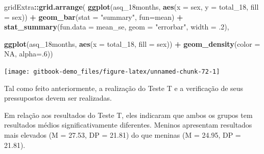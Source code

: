 \documentclass[
]{book}
\newenvironment{Shaded}{\begin{snugshade}}{\end{snugshade}}
\newcommand{\DataTypeTok}[1]{\textcolor[rgb]{0.13,0.29,0.53}{#1}}
\newcommand{\DecValTok}[1]{\textcolor[rgb]{0.00,0.00,0.81}{#1}}
\newcommand{\FloatTok}[1]{\textcolor[rgb]{0.00,0.00,0.81}{#1}}
\newcommand{\KeywordTok}[1]{\textcolor[rgb]{0.13,0.29,0.53}{\textbf{#1}}}
\newcommand{\NormalTok}[1]{#1}
\newcommand{\OperatorTok}[1]{\textcolor[rgb]{0.81,0.36,0.00}{\textbf{#1}}}
\newcommand{\OtherTok}[1]{\textcolor[rgb]{0.56,0.35,0.01}{#1}}
\newcommand{\StringTok}[1]{\textcolor[rgb]{0.31,0.60,0.02}{#1}}
\begin{document}
\begin{Shaded}
\begin{Highlighting}[]
\NormalTok{gridExtra}\OperatorTok{::}\KeywordTok{grid.arrange}\NormalTok{(}
  \KeywordTok{ggplot}\NormalTok{(asq_18months, }\KeywordTok{aes}\NormalTok{(}\DataTypeTok{x =}\NormalTok{ sex, }\DataTypeTok{y =}\NormalTok{ total_}\DecValTok{18}\NormalTok{, }\DataTypeTok{fill =}\NormalTok{ sex)) }\OperatorTok{+}
\StringTok{  }\KeywordTok{geom_bar}\NormalTok{(}\DataTypeTok{stat =} \StringTok{"summary"}\NormalTok{, }\DataTypeTok{fun=}\NormalTok{mean) }\OperatorTok{+}
\StringTok{  }\KeywordTok{stat_summary}\NormalTok{(}\DataTypeTok{fun.data =}\NormalTok{ mean_se, }\DataTypeTok{geom =} \StringTok{"errorbar"}\NormalTok{, }\DataTypeTok{width =} \FloatTok{.2}\NormalTok{),}

  \KeywordTok{ggplot}\NormalTok{(asq_18months, }\KeywordTok{aes}\NormalTok{(}\DataTypeTok{x =}\NormalTok{ total_}\DecValTok{18}\NormalTok{, }\DataTypeTok{fill =}\NormalTok{ sex)) }\OperatorTok{+}\StringTok{ }
\StringTok{  }\KeywordTok{geom_density}\NormalTok{(}\DataTypeTok{color =} \OtherTok{NA}\NormalTok{, }\DataTypeTok{alpha=}\NormalTok{.}\DecValTok{6}\NormalTok{))}
\end{Highlighting}
\end{Shaded}

\begin{center}\texttt{[image: gitbook-demo\_files/figure-latex/unnamed-chunk-72-1]} \end{center}

Tal como feito anteriormente, a realização do Teste T e a verificação de
seus pressupostos devem ser realizadas.

Em relação aos resultados do Teste T, eles indicaram que ambos os grupos
tem resultados médios significativamente diferentes. Meninos apresentam
resultados mais elevados (M = 27.53, DP = 21.81) do que meninas (M =
24.95, DP = 21.81).

\begin{Shaded}
\end{Shaded}
\end{document}
